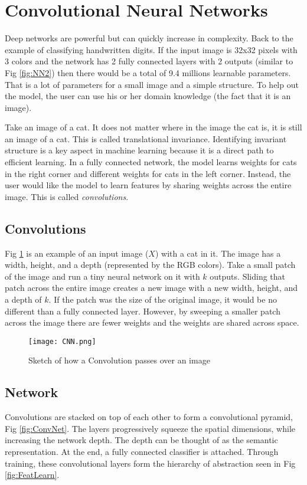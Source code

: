\section{Convolutional Neural Networks}
Deep networks are powerful but can quickly increase in complexity.  Back to the example of classifying handwritten digits.  If the input image is 32x32 pixels with 3 colors and the network has 2 fully connected layers with 2 outputs (similar to Fig \ref{fig:NN2}) then there would be a total of 9.4 millions learnable parameters.  That is a lot of parameters for a small image and a simple structure.  To help out the model, the user can use his or her domain knowledge (the fact that it is an image).    

Take an image of a cat.  It does not matter where in the image the cat is, it is still an image of a cat.  This is called translational invariance.  Identifying invariant structure is a key aspect in machine learning because it is a direct path to efficient learning.  In a fully connected network, the model learns weights for cats in the right corner and different weights for cats in the left corner.  Instead, the user would like the model to learn features by sharing weights across the entire image.  This is called \emph{convolutions}.   
\subsection{Convolutions}
Fig \ref{fig:CNN} is an example of an input image ($X$)  with a cat in it.  The image has a width, height, and a depth (represented by the RGB colors).  Take a small patch of the image and run a tiny neural network on it with $k$ outputs.  Sliding that patch across the entire image creates a new image with a new width, height, and a depth of $k$.  If the patch was the size of the original image, it would be no different than a fully connected layer.  However, by sweeping a smaller patch across the image  there are fewer weights and the weights are shared across space.  

\begin{figure}[!h]
 \begin{center}
 \texttt{[image: CNN.png]}
 \caption{Sketch of how a Convolution passes over an image \cite{Udacity}}
 \label{fig:CNN}
 \end{center}
 \end{figure}

\subsection{Network}
Convolutions are stacked on top of each other to form a convolutional pyramid, Fig \ref{fig:ConvNet}.  The layers progressively squeeze the spatial dimensions, while increasing the network depth.  The depth can be thought of as the semantic representation.  At the end, a fully connected classifier is attached.  Through training, these convolutional layers form the hierarchy of abstraction seen in Fig \ref{fig:FeatLearn}. \cite{Udacity} \cite{DataWknd} 

